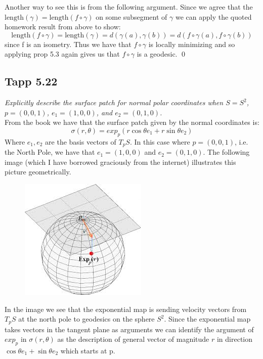 \documentclass[a4paper, 11pt]{article}
\begin{document}
	\noindent Another way to see this is from the following argument. Since we agree that the $\text{length}(\gamma) = \text{length}(f\circ\gamma)$ on some subsegment of $\gamma$ we can apply the quoted homework result from above to show: 
		\begin{equation*}
			\text{length}(f\circ\gamma)=\text{length}(\gamma) = d(\gamma(a),\gamma(b)) = d(f\circ\gamma(a),f\circ\gamma(b))
		\end{equation*} 
	since f is an isometry. Thus we have that $f\circ\gamma$ is locally minimizing and so applying prop 5.3 again gives us that $f\circ\gamma$ is a geodesic. \qed 
		
\subsection*{Tapp 5.22}
	\textit{Explicitly describe the surface patch for normal polar coordinates when $S = S^2$, $p = (0,0,1)$, $e_1 = (1,0,0)$, and $e_2 = (0,1,0)$.}\\
	
	\noindent From the book we have that the surface patch given by the normal coordinates is: 
		\begin{equation*}
			\sigma(r, \theta) = exp_p(r\cos\theta e_1 + r\sin\theta e_2)
		\end{equation*}
	Where $e_1, e_2$ are the basis vectors of $T_pS$. In this case where $p=(0,0,1)$, i.e. the North Pole, we have that $e_1 = (1,0,0)$ and $e_2 = (0,1,0)$. The following image (which I have borrowed graciously from the internet) illustrates this picture geometrically. \\
		\begin{figure}[!hbt]
			\centering
			\includegraphics[width=0.35\columnwidth]{sphereMap}
		\end{figure}
	
	\noindent In the image we see that the exponential map is sending velocity vectors from $T_pS$ at the north pole to geodesics on the sphere $S^2$. Since the exponential map takes vectors in the tangent plane as arguments we can identify the argument of $exp_p$ in $\sigma(r,\theta)$ as the description of general vector of magnitude $r$ in direction $\cos\theta e_1 + \sin\theta e_2$ which starts at p. \\ 
	
\end{document}
